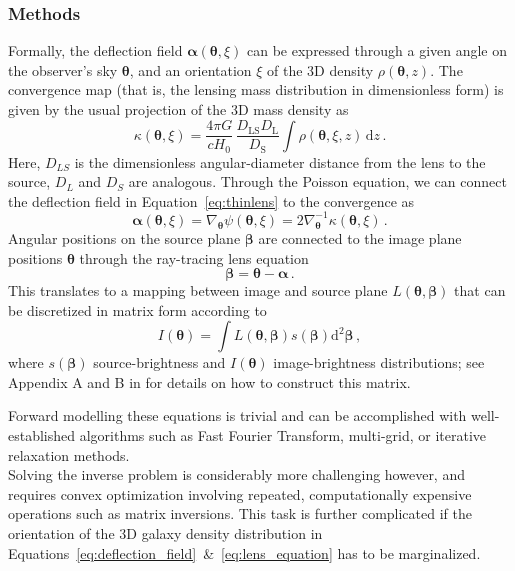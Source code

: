 \documentclass[a4paper,10pt]{article}
\begin{document}
\subsubsection{Methods}
\label{sec:orgcee4dd7}
\label{sec:methods}
Formally, the deflection field \(\bm\alpha(\bm\theta, \xi)\) can be
expressed through a given angle on the observer's sky \(\bm\theta\), and
an orientation \(\xi\) of the 3D density \(\rho(\bm\theta,z)\). The
convergence map (that is, the lensing mass distribution in
dimensionless form) is given by the usual projection of the 3D mass
density as
\begin{equation}\label{eq:thinlens}%
  \kappa(\bm\theta,\xi) = \frac{4\pi G}{cH_0}\, \frac{D_\mathrm{LS}D_\mathrm{L}}{D_\mathrm{S}} \int \rho(\bm\theta,\xi,z)\,\mathrm{d}z \,.
\end{equation}
Here, \(D_{LS}\) is the dimensionless angular-diameter distance from the
lens to the source, \(D_L\) and \(D_S\) are analogous.  Through the
Poisson equation, we can connect the deflection field in
Equation~\eqref{eq:thinlens} to the convergence as
\begin{equation}\label{eq:deflection_field}%
  \bm\alpha(\bm\theta,\xi) = \nabla_{\bm\theta}\psi(\bm\theta,\xi) = 2\nabla_{\bm\theta}^{-1}\kappa(\bm\theta,\xi) \,.
\end{equation}
Angular positions on the source plane \(\bm\beta\) are connected to the
image plane positions \(\bm\theta\) through the ray-tracing lens
equation
\begin{equation}\label{eq:lens_equation}%
  \bm\beta = \bm\theta - \bm\alpha \,.
\end{equation}
This translates to a mapping between image and source plane
\(L(\bm\theta, \bm\beta)\) that can be discretized in matrix form
according to
\begin{equation}%
  I(\bm\theta) = \int L(\bm\theta, \bm\beta) s(\bm\beta) \mathrm{d^{2}}\bm\beta\,,
\end{equation}
where \(s(\bm\beta)\) source-brightness and \(I(\bm\theta)\)
image-brightness distributions; see Appendix A and B in
\cite{Treu2004} for details on how to construct this matrix.

Forward modelling these equations is trivial and can be accomplished
with well-established algorithms such as Fast Fourier Transform,
multi-grid, or iterative relaxation methods. \\[0pt]
Solving the inverse problem is considerably more challenging however,
and requires convex optimization involving repeated, computationally
expensive operations such as matrix inversions. This task is further
complicated if the orientation of the 3D galaxy density distribution
in
Equations~\eqref{eq:deflection_field}~\&~\eqref{eq:lens_equation}
has to be marginalized.
\end{document}

